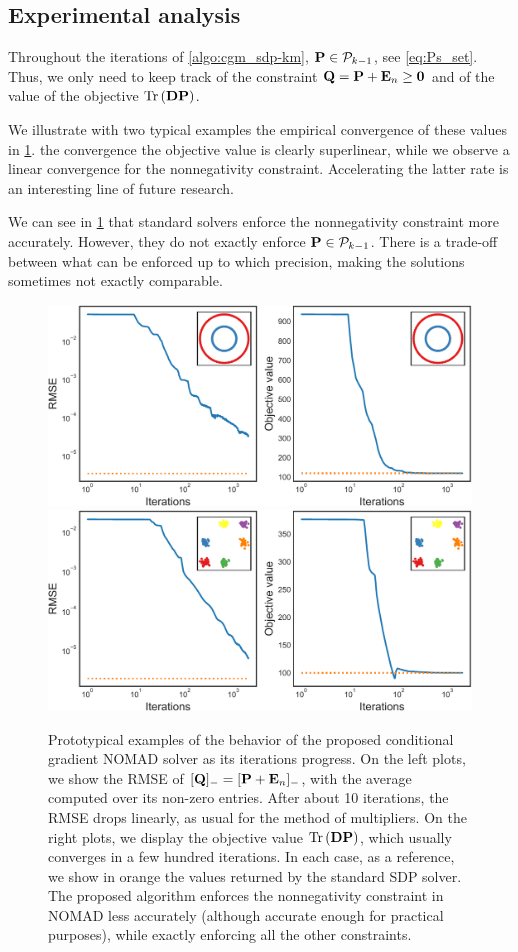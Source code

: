 \documentclass[twoside,11pt]{article}
\begin{document}
\subsection{Experimental analysis}

Throughout the iterations of \cref{algo:cgm_sdp-km}, ${\mathbf{P}} \in {\mathcal{P}}_{k-1}$, see \cref{eq:Ps_set}. Thus, we only need to keep track of the constraint ${\mathbf{Q}} = {\mathbf{P}} + {\mathbf{E}}_n \geq {\mathbf{0}}$ and of the value of the objective $\operatorname{Tr}\left({\mathbf{D}} {\mathbf{P}}\right)$.

We illustrate with two typical examples the empirical convergence of these values in \cref{fig:cvx_vs_cgm_convergence}.
the convergence the objective value is clearly superlinear, while we observe a linear convergence for the nonnegativity constraint. Accelerating the latter rate is an interesting line of future research.

We can see in \cref{fig:cvx_vs_cgm_convergence} that standard solvers enforce the nonnegativity constraint more accurately. However, they do not exactly enforce ${\mathbf{P}} \in {\mathcal{P}}_{k-1}$. There is a trade-off between what can be enforced up to which precision, making the solutions sometimes not exactly comparable.



\begin{figure}
	\centering
	\includegraphics[width=.5\linewidth]{cvx_vs_cgm/circles_cgm_convergence}%
    \includegraphics[width=.5\linewidth]{cvx_vs_cgm/gaussian_blobs_cgm_convergence}%
		
	\caption{Prototypical examples of the behavior of the proposed conditional gradient NOMAD solver as its iterations progress. On the left plots, we show the RMSE of $[{\mathbf{Q}}]_{-} = [{\mathbf{P}} + {\mathbf{E}}_n]_{-}$, with the average computed over its non-zero entries. After about 10 iterations, the RMSE drops linearly, as usual for the method of multipliers. On the right plots, we display the objective value $\operatorname{Tr}\left({\mathbf{D}} {\mathbf{P}}\right)$, which usually converges in a few hundred iterations. In each case, as a reference, we show in orange the values returned by the standard SDP solver. The proposed algorithm enforces the nonnegativity constraint in NOMAD less accurately (although accurate enough for practical purposes), while exactly enforcing all the other constraints.}
	\label{fig:cvx_vs_cgm_convergence}
\end{figure}
\end{document}
